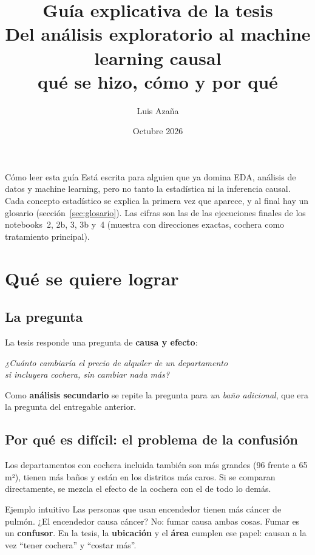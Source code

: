 \documentclass[11pt,a4paper]{article}
\title{\color{azul}\textbf{Guía explicativa de la tesis}\\[4pt]\large Del análisis exploratorio al machine learning causal\\ qué se hizo, cómo y por qué}
\author{Luis Azaña}
\date{Octubre 2026}
\begin{document}
\maketitle

\begin{idea}{Cómo leer esta guía}
Está escrita para alguien que ya domina EDA, análisis de datos y machine learning, pero no tanto la estadística ni la inferencia causal. Cada concepto estadístico se explica la primera vez que aparece, y al final hay un glosario (sección~\ref{sec:glosario}). Las cifras son las de las ejecuciones finales de los notebooks~2, 2b, 3, 3b y~4 (muestra con direcciones exactas, cochera como tratamiento principal).
\end{idea}

\tableofcontents
\newpage

\section{Qué se quiere lograr}

\subsection{La pregunta}

La tesis responde una pregunta de \textbf{causa y efecto}:

\begin{center}
\large\itshape ¿Cuánto cambiaría el precio de alquiler de un departamento\\ si incluyera cochera, sin cambiar nada más?
\end{center}

Como \textbf{análisis secundario} se repite la pregunta para \emph{un baño adicional}, que era la pregunta del entregable anterior.

\subsection{Por qué es difícil: el problema de la confusión}

Los departamentos con cochera incluida también son más grandes (96 frente a 65\,m²), tienen más baños y están en los distritos más caros. Si se comparan directamente, se mezcla el efecto de la cochera con el de todo lo demás.

\begin{idea}{Ejemplo intuitivo}
Las personas que usan encendedor tienen más cáncer de pulmón. ¿El encendedor causa cáncer? No: fumar causa ambas cosas. Fumar es un \textbf{confusor}. En la tesis, la \textbf{ubicación} y el \textbf{área} cumplen ese papel: causan a la vez ``tener cochera'' y ``costar más''.
\end{idea}
\end{document}

